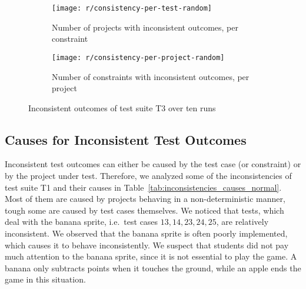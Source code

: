\begin{figure}[htpb]
    \centering
    \begin{subfigure}{.75\textwidth}
        \texttt{[image: r/consistency-per-test-random]}%
        \vspace{-\medskipamount}
        \caption{Number of projects with inconsistent outcomes, per constraint}
        \label{fig:consistency_per_test_random}
    \end{subfigure}

    \bigskip

    \begin{subfigure}{.75\textwidth}
        \texttt{[image: r/consistency-per-project-random]}%
        \vspace{-\medskipamount}
        \caption{Number of constraints with inconsistent outcomes, per project}
        \label{fig:consistency_per_project_random}
    \end{subfigure}

    \caption{Inconsistent outcomes of test suite T3 over ten runs}
    \label{fig:consistency_random}
\end{figure}

\subsection{Causes for Inconsistent Test Outcomes}

Inconsistent test outcomes can either be caused by the test case (or constraint) or by the project under test.
Therefore, we analyzed some of the inconsistencies of test suite T1 and their causes in Table~\ref{tab:inconsistencies_causes_normal}.
Most of them are caused by projects behaving in a non-deterministic manner,
tough some are caused by test cases themselves.
We noticed that tests, which deal with the banana sprite, i.e.\ test cases $13, 14, 23, 24, 25$, are relatively inconsistent.
We observed that the banana sprite is often poorly implemented, which causes it to behave inconsistently.
We suspect that students did not pay much attention to the banana sprite, since it is not essential to play the game.
A banana only subtracts points when it touches the ground, while an apple ends the game in this situation.
\parspace

